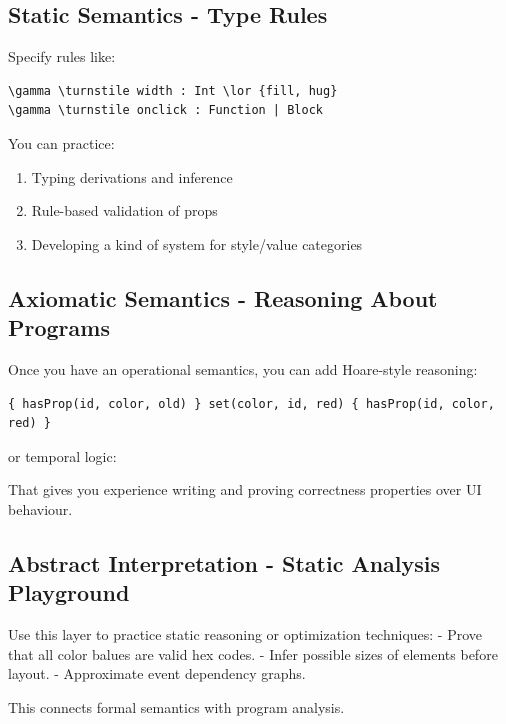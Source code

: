 \documentclass{article}
\begin{document}
\subsection{Static Semantics - Type Rules}
Specify rules like:
\begin{verbatim}
\gamma \turnstile width : Int \lor {fill, hug}
\gamma \turnstile onclick : Function | Block
\end{verbatim}
You can practice:
\begin{enumerate}
\item Typing derivations and inference
\item Rule-based validation of props
\item Developing a kind of system for style/value categories
\end{enumerate}

\subsection{Axiomatic Semantics - Reasoning About Programs}
Once you have an operational semantics, you can add Hoare-style reasoning:
\begin{verbatim}
{ hasProp(id, color, old) } set(color, id, red) { hasProp(id, color, red) }
\end{verbatim}
or temporal logic:

That gives you experience writing and proving correctness properties over UI behaviour. 

\subsection{Abstract Interpretation - Static Analysis Playground}
Use this layer to practice static reasoning or optimization techniques:
- Prove that all color balues are valid hex codes.
- Infer possible sizes of elements before layout.
- Approximate event dependency graphs.

This connects formal semantics with program analysis.
\end{document}
